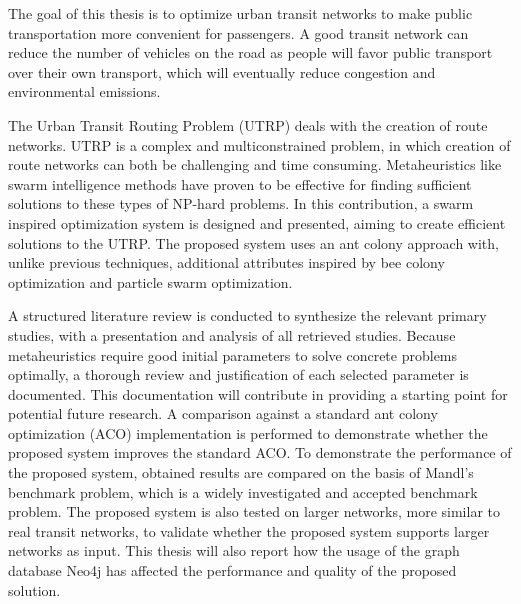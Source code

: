 

The goal of this thesis is to optimize urban transit networks to make public transportation more convenient for passengers. A good transit network can reduce the number of vehicles on the road as people will favor public transport over their own transport, which will eventually reduce congestion and environmental emissions.

The Urban Transit Routing Problem (UTRP) deals with the creation of route networks.  UTRP is a complex and multiconstrained problem, in which creation of route networks can both be challenging and time consuming. Metaheuristics like swarm intelligence methods have proven to be effective for finding sufficient solutions to these types of NP-hard problems. In this contribution, a swarm inspired optimization system is designed and presented, aiming to create efficient solutions to the UTRP. The proposed system uses an ant colony approach with, unlike previous techniques, additional attributes inspired by bee colony optimization and particle swarm optimization. 

A structured literature review is conducted to synthesize the relevant primary studies, with a presentation and analysis of all retrieved studies.  Because metaheuristics require good initial parameters to solve concrete problems optimally, a thorough review and justification of each selected parameter is documented. This documentation will contribute in providing a starting point for potential future research. A comparison against a standard ant colony optimization (ACO) implementation is performed to demonstrate whether the proposed system improves the standard ACO. To demonstrate the performance of the proposed system, obtained results are compared on the basis of Mandl's benchmark problem, which is a widely investigated and accepted benchmark problem. The proposed system is also tested on larger networks, more similar to real transit networks, to validate whether the proposed system supports larger networks as input. This thesis will also report how the usage of the graph database Neo4j has affected the performance and quality of the proposed solution. 

